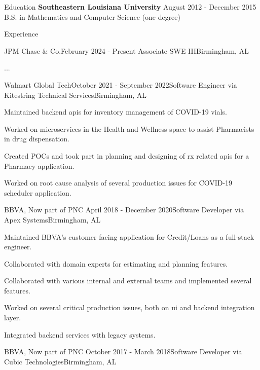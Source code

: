 \documentclass[11pt,]{resume}
\begin{document}
	\begin{rSection}{Education}
		\textbf{Southeastern Louisiana University} \hfill{August 2012 - December 2015} \\ B.S. in Mathematics and Computer Science (one degree)
	\end{rSection}

	\begin{rSection}{Experience}
		\begin{rSubsection}{JPM Chase & Co.}{February 2024 - Present} {Associate SWE III}{Birmingham, AL}
			\item ...
		\end{rSubsection}

		\begin{rSubsection}{Walmart Global Tech}{October 2021 - September 2022}{Software Engineer via Kitestring Technical Services}{Birmingham, AL}
			\item Maintained backend apis for inventory management of COVID-19 vials.
			\item Worked on microservices in the Health and Wellness space to assist Pharmacists in drug dispensation.
			\item Created POCs and took part in planning and designing of rx related apis for a Pharmacy application.
			\item Worked on root cause analysis of several production issues for COVID-19 scheduler application.
		\end{rSubsection}

		\begin{rSubsection}{BBVA, Now part of PNC }{April 2018 - December 2020}{Software Developer via Apex Systems}{Birmingham, AL}
			\item Maintained BBVA's customer facing application for Credit/Loans as a full-stack engineer.
			\item Collaborated with domain experts for estimating and planning features.
			\item Collaborated with various internal and external teams and implemented several features.
			\item Worked on several critical production issues, both on ui and backend integration layer.
			\item Integrated backend services with legacy systems.
		\end{rSubsection}

		\begin{rSubsection}{BBVA, Now part of PNC }{October 2017 - March 2018}{Software Developer via Cubic Technologies}{Birmingham, AL}
			\item[]\vspace{-1.5\baselineskip}
		\end{rSubsection}
	\end{rSection}
\end{document}

